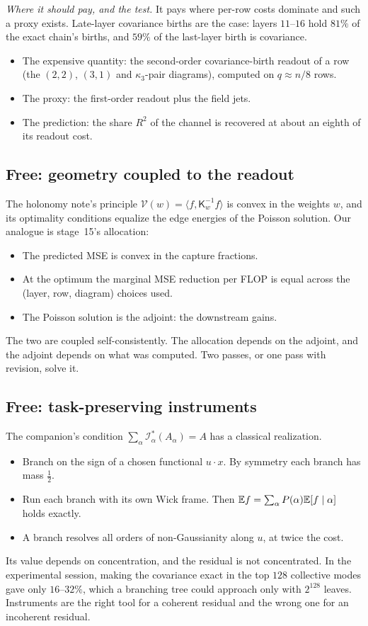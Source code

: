 \emph{Where it should pay, and the test.} It pays where per-row costs dominate and such a proxy exists. Late-layer covariance births are
the case: layers $11$--$16$ hold $81\%$ of the exact chain's births, and $59\%$ of the last-layer birth is covariance.
\begin{itemize}[leftmargin=*]
\item The expensive quantity: the second-order covariance-birth readout of a row (the $(2,2)$, $(3,1)$ and $\kappa_3$-pair diagrams),
computed on $q\approx n/8$ rows.
\item The proxy: the first-order readout plus the field jets.
\item The prediction: the share $R^2$ of the channel is recovered at about an eighth of its readout cost.
\end{itemize}

\subsection{Free: geometry coupled to the readout}
The holonomy note's principle $\mathcal V(w)=\langle f,\mathsf K_w^{-1}f\rangle$ is convex in the weights $w$, and its optimality conditions equalize the edge
energies of the Poisson solution. Our analogue is stage~15's allocation:
\begin{itemize}[leftmargin=*]
\item The predicted MSE is convex in the capture fractions.
\item At the optimum the marginal MSE reduction per FLOP is equal across the (layer, row, diagram) choices used.
\item The Poisson solution is the adjoint: the downstream gains.
\end{itemize}
The two are coupled self-consistently. The allocation depends on the adjoint, and the adjoint depends on what was computed. Two passes,
or one pass with revision, solve it.

\subsection{Free: task-preserving instruments}
The companion's condition $\sum_\alpha\mathcal I_\alpha^*(A_\alpha)=A$ has a classical realization.
\begin{itemize}[leftmargin=*]
\item Branch on the sign of a chosen functional $u\cdot x$. By symmetry each branch has mass $\frac12$.
\item Run each branch with its own Wick frame. Then $\mathbb E f=\sum_\alpha P(\alpha)\mathbb E[f\mid\alpha]$ holds exactly.
\item A branch resolves all orders of non-Gaussianity along $u$, at twice the cost.
\end{itemize}
Its value depends on concentration, and the residual is not concentrated. In the experimental session, making the covariance exact in the top
$128$ collective modes gave only $16$--$32\%$, which a branching tree could approach only with $2^{128}$ leaves. Instruments are the right tool for
a coherent residual and the wrong one for an incoherent residual.

